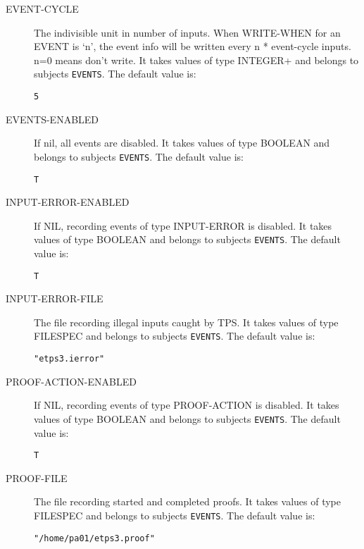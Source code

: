 \begin{description}
\item[EVENT-CYCLE]  
The indivisible unit in number of inputs.
When WRITE-WHEN for an EVENT is `n', the event info will be written
every n * event-cycle inputs.  n=0 means don't write.
It takes values of type INTEGER+ and belongs to subjects \texttt{EVENTS}.  The default value is: \begin{lstlisting}
5
\end{lstlisting}

\item[EVENTS-ENABLED]  
If nil, all events are disabled.
It takes values of type BOOLEAN and belongs to subjects \texttt{EVENTS}.  The default value is: \begin{lstlisting}
T
\end{lstlisting}

\item[INPUT-ERROR-ENABLED]  
If NIL, recording events of type INPUT-ERROR is disabled.
It takes values of type BOOLEAN and belongs to subjects \texttt{EVENTS}.  The default value is: \begin{lstlisting}
T
\end{lstlisting}

\item[INPUT-ERROR-FILE]  
The file recording illegal inputs caught by TPS.
It takes values of type FILESPEC and belongs to subjects \texttt{EVENTS}.  The default value is: \begin{lstlisting}
"etps3.ierror"
\end{lstlisting}

\item[PROOF-ACTION-ENABLED]  
If NIL, recording events of type PROOF-ACTION is disabled.
It takes values of type BOOLEAN and belongs to subjects \texttt{EVENTS}.  The default value is: \begin{lstlisting}
T
\end{lstlisting}

\item[PROOF-FILE]  
The file recording started and completed proofs.
It takes values of type FILESPEC and belongs to subjects \texttt{EVENTS}.  The default value is: \begin{lstlisting}
"/home/pa01/etps3.proof"
\end{lstlisting}


\end{description}
